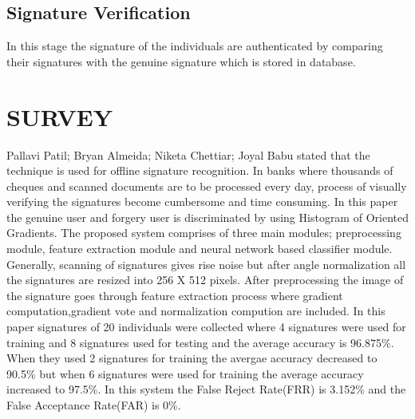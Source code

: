 \documentclass[]{article}
\begin{document}
	\subsection{Signature Verification}
	In this stage the signature of the individuals are authenticated by comparing their signatures with the genuine signature which is stored in database.
	\section{SURVEY}
	Pallavi Patil; Bryan Almeida; Niketa Chettiar; Joyal Babu \cite{bib1} stated that the technique is used for offline signature recognition. In banks where thousands of
	cheques and scanned documents are to be processed every day, process of visually verifying the signatures become cumbersome and time consuming. In this paper the genuine user and forgery user is discriminated by using Histogram of Oriented Gradients. The proposed system comprises of three main modules;	preprocessing module, feature extraction module and neural network based classifier module. Generally, scanning of signatures gives rise noise but after angle normalization all the signatures are resized into 256 X 512 pixels. After preprocessing the image of the signature goes through feature extraction process where gradient computation,gradient vote and normalization compution are included. In this paper signatures of 20 individuals were collected where 4 signatures were used for training and 8 signatures used for testing and the average accuracy is 96.875\%. When they used 2 signatures for training the avergae accuracy decreased to 90.5\% but when 6 signatures were used for training the average accuracy increased to 97.5\%. In this system the False Reject Rate(FRR) is 3.152\% and the False Acceptance Rate(FAR) is 0\%.\\\\
	
\end{document}
